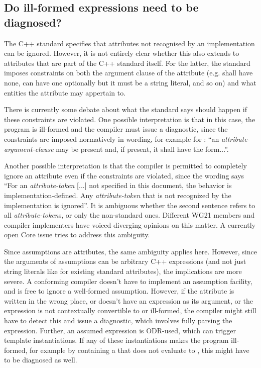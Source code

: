 \subsection{Do ill-formed expressions need to be diagnosed?}
\label{subsec:well_formed}

The C++ standard specifies that attributes not recognised by an implementation can be ignored. However, it is not entirely clear whether this also extends to attributes that are part of the C++ standard itself. For the latter, the standard imposes constraints on both the argument clause of the attribute (e.g. \tcode{[[noreturn]]} shall have none, \tcode{[[deprecated]]} can have one optionally but it must be a string literal, and so on) and what entities the attribute may appertain to.

There is currently some debate about what the standard says should happen if these constraints are violated. One possible interpretation is that in this case, the program is ill-formed and the compiler must issue a diagnostic, since the constraints are imposed normatively in wording, for example for \tcode{[[deprecated]]}: ``an \emph{attribute-argument-clause} may be present and, if present, it shall have the form...''.

Another possible interpretation is that the compiler is permitted to completely ignore an attribute even if the constraints are violated, since the wording says ``For an \emph{attribute-token} [...] not specified in this document, the behavior is implementation-defined. Any \emph{attribute-token} that is not recognized by the implementation is ignored''. It is ambiguous whether the second sentence refers to all \emph{attribute-token}s, or only the non-standard ones. Different WG21 members and compiler implementers have voiced diverging opinions on this matter. A currently open Core issue \cite{CWG2538} tries to address this ambiguity.

Since assumptions are attributes, the same ambiguity applies here. However, since the arguments of assumptions can be arbitrary C++ expressions (and not just string literals like for existing standard attributes), the implications are more severe. A conforming compiler doesn't have to implement an assumption facility, and is free to ignore a well-formed assumption. However, if the  attribute is written in the wrong place, or doesn't have an expression as its argument, or the expression is not contextually convertible to  or ill-formed, the compiler might still have to detect this and issue a diagnostic, which involves fully parsing the expression. Further, an assumed expression is ODR-used, which can trigger template instantiations. If any of these instantiations makes the program ill-formed, for example by containing a  that does not evaluate to , this might have to be diagnosed as well.

